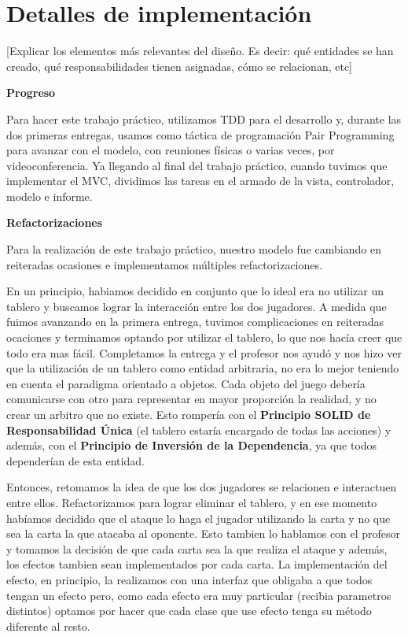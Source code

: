 \section{Detalles de implementación}
[Explicar los elementos más relevantes del diseño. Es decir: qué
entidades se han creado, qué responsabilidades tienen asignadas, cómo
se relacionan, etc]




{\large\textbf{Progreso}}

\bigskip


Para hacer este trabajo práctico, utilizamos TDD para el desarrollo y, durante las dos primeras entregas, usamos como táctica de programación Pair Programming para avanzar con el modelo, con reuniones físicas o varias veces, por videoconferencia. Ya llegando al final del trabajo práctico, cuando tuvimos que implementar el MVC, dividimos las tareas en el armado de la vista, controlador, modelo e informe. 

\bigskip


{\large\textbf{Refactorizaciones}}

\bigskip

Para la realización de este trabajo práctico, nuestro modelo fue cambiando en reiteradas ocasiones e implementamos múltiples refactorizaciones. 

\medskip

En un principio, habiamos decidido en conjunto que lo ideal era no utilizar un tablero y buscamos lograr la interacción entre los dos jugadores. A medida que fuimos avanzando en la primera entrega, tuvimos complicaciones en reiteradas ocaciones y terminamos optando por utilizar el tablero, lo que nos hacía creer que todo era mas fácil. Completamos la entrega y el profesor nos ayudó y nos hizo ver que la utilización de un tablero como entidad arbitraria, no era lo mejor teniendo en cuenta el paradigma orientado a objetos. Cada objeto del juego debería comunicarse con otro para representar en mayor proporción la realidad, y no crear un arbitro que no existe. Esto rompería con el \textbf{Principio SOLID de Responsabilidad Única} (el tablero estaría encargado de todas las acciones) y además, con el \textbf{Principio de Inversión de la Dependencia}, ya que todos dependerían de esta entidad.

\medskip

Entonces, retomamos la idea de que los dos jugadores se relacionen e interactuen entre ellos. Refactorizamos para lograr eliminar el tablero, y en ese momento habíamos decidido que el ataque lo haga el jugador utilizando la carta y no que sea la carta la que atacaba al oponente. Esto tambien lo hablamos con el profesor y tomamos la decisión de que cada carta sea la que realiza el ataque y además, los efectos tambien sean implementados por cada carta. La implementación del efecto, en principio, la realizamos con una interfaz que obligaba a que todos tengan un efecto pero, como cada efecto era muy particular (recibia parametros distintos) optamos por hacer que cada clase que use efecto tenga su método diferente al resto.


